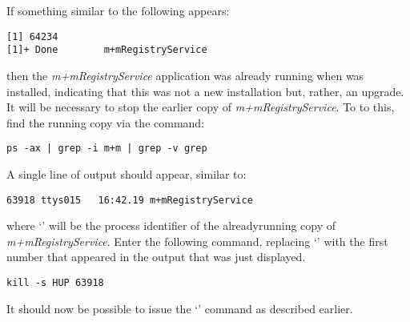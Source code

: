 If something similar to the following appears:
\outputBegin
\begin{verbatim}
[1] 64234
[1]+ Done        m+mRegistryService
\end{verbatim}
\outputEnd{}
then the \emph{m+mRegistryService} application was already running when \mplusm{} was
installed, indicating that this was not a new installation but, rather, an upgrade.
\condPage{}
It will be necessary to stop the earlier copy of \emph{m+mRegistryService}.
To to this, find the running copy via the command:
\outputBegin
\begin{verbatim}
ps -ax | grep -i m+m | grep -v grep
\end{verbatim}
\outputEnd{}
A single line of output should appear, similar to:
\outputBegin
\begin{verbatim}
63918 ttys015   16:42.19 m+mRegistryService
\end{verbatim}
\outputEnd{}
where `' will be the process identifier of the already\longDash{}running
copy of \emph{m+mRegistryService}.
Enter the following command, replacing `' with the first number that
appeared in the output that was just displayed.
\outputBegin
\begin{verbatim}
kill -s HUP 63918
\end{verbatim}
\outputEnd{}
It should now be possible to issue the `' command as
described earlier.\\

